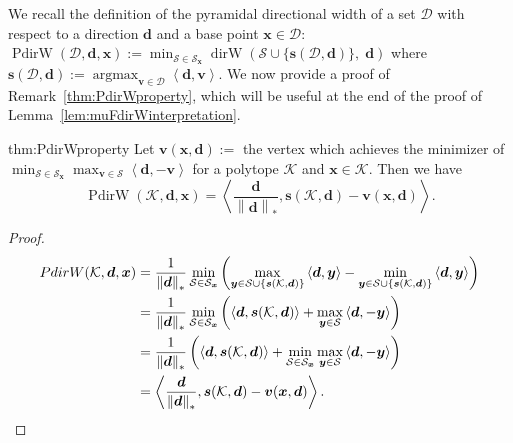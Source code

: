 \documentclass{article} %
\DeclareMathOperator*{\argmax}{\arg\max}
\providecommand{\norm}[1]{\left\lVert#1\right\rVert}
\providecommand{\dualnorm}[1]{\norm{#1}_*}
\newcommand{\domain}{\mathcal{D}}
\newcommand{\dirW}{\mathop{dirW}}
\newcommand{\x}{\bm{x}}
\newcommand{\y}{\bm{y}}
\newcommand{\s}{\bm{s}}
\newcommand{\dd}{\bm{d}}
\newcommand{\vv}{\bm{v}} %
\renewcommand{\S}{\mathcal{S}}
\newcommand{\PdirW}{\mathop{PdirW}}
\newcommand{\innerProd}[2]{\left\langle #1 , #2 \right\rangle}
\newcommand{\Kface}{\mathcal{K}}
\newcommand{\0}{\mathbf{0}} %
\begin{document}
We recall the definition of the pyramidal directional width of a set $\domain$ with respect to a direction $\dd$ and a base point $\x \in \domain$:
$
\PdirW(\domain,\dd, \x) := \min_{\S \in \S_{\x}} \dirW( \S \cup \{\s(\domain, \dd) \} , \; \dd)
$
where $\s(\domain,\dd) := \argmax_{\vv \in \domain}  \left\langle \dd, \vv \right\rangle$. We now provide a proof of Remark~\ref{thm:PdirWproperty}, which will be useful at the end of the proof of Lemma~\ref{lem:muFdirWinterpretation}.

\begin{repremark}{thm:PdirWproperty}
Let $ \vv(\x, \dd) :=$ the vertex which achieves the minimizer of  $\min_{\S \in \S_{\x}} \max_{\vv \in \S } \innerProd{\dd}{-\vv}$ for a polytope $\Kface$ and $\x \in \Kface$. Then we have
\begin{equation} \label{eq:PdirWproperty}
	\PdirW(\Kface,\dd, \x) = \innerProd{\frac{\dd}{\dualnorm{\dd}}}{ \s(\Kface,\dd) - \vv(\x, \dd)}.
\end{equation}
\end{repremark}
\begin{proof}
\begin{align*}
\PdirW(\Kface,\dd, \x) &= \frac{1}{\norm{\dd}_*} \min_{\S \in \S_{\x}} \left( \max_{\y \in  \S \cup \{\s(\Kface,\dd) \}} \innerProd{\dd}{\y} - \min_{\y \in \S \cup \{\s(\Kface,\dd) \} } \innerProd{\dd}{\y} \right) \\
	&= \frac{1}{\norm{\dd}_*} \min_{\S \in \S_{\x}} \left( \innerProd{\dd}{\s(\Kface,\dd)} + \max_{\y \in \S} \innerProd{\dd}{-\y} \right) \\
	&= \frac{1}{\norm{\dd}_*} \left( \innerProd{\dd}{\s(\Kface,\dd)} +  \min_{\S \in \S_{\x}} \max_{\y \in \S} \innerProd{\dd}{-\y} \right) \\
	&=\innerProd{\frac{\dd}{\dualnorm{\dd}}}{ \s(\Kface,\dd) - \vv(\x, \dd)}.
	\vspace{-5mm}
\end{align*}
\end{proof}
\end{document}
